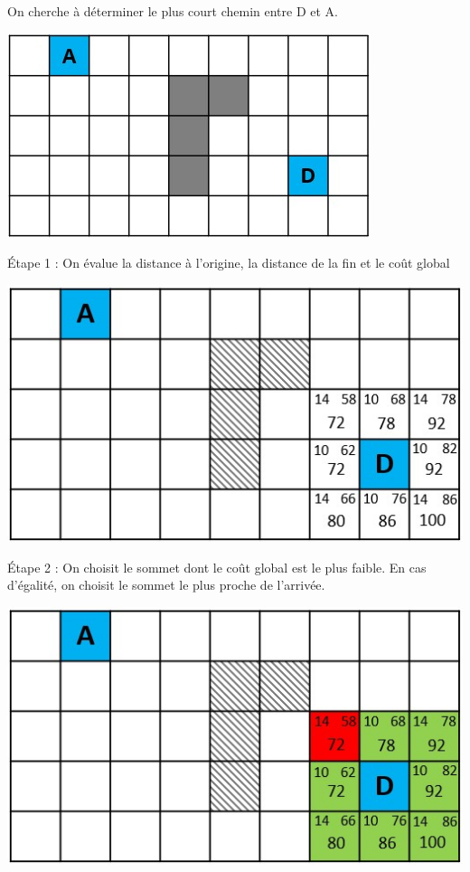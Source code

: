 On cherche à déterminer le plus court chemin entre D et A.
\begin{center}
\includegraphics[scale=0.6]{images/quadri2.jpg}
\end{center}

\'Etape 1 : On évalue la distance à l'origine, la distance de la fin et le coût global
\begin{center}
\includegraphics[scale=0.8]{images/quadri3.jpg}
\end{center}

\'Etape 2 : On choisit le sommet dont le coût global est le plus faible. En cas d'égalité, on choisit le sommet le plus proche de l'arrivée.
\begin{center}
\includegraphics[scale=0.8]{images/quadri4.jpg}
\end{center}

